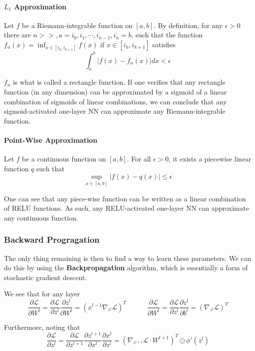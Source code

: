 \documentclass{article}
\newcommand{\loss}{\mathcal{L}}
\begin{document}
\paragraph{$L_1$ Approximation}

Let $f$ be a Riemann-integrable function on $[a,b]$.
By definition, for any $\epsilon > 0$ there are $n >> , a = i_0, i_1, \cdots, i_{n-1}, i_n = b$, such that the function $f_n(x) = \inf_{x \in [i_k, i_{k+1}]} f(x)$ if $x \in [i_k, i_{k+1}]$ satisfies
$$
\int_a^b |f(x) - f_n(x)| dx < \epsilon
$$

$f_n$ is what is called a rectangle function.
If one verifies that any rectangle function (in any dimension) can be approximated by a sigmoid of a linear combination of sigmoids of linear combinations, we can conclude that any sigmoid-activated one-layer NN can approximate any Riemann-integrable function.

\paragraph{Point-Wise Approximation}

Let $f$ be a continuous function on $[a,b]$.
For all $\epsilon > 0$, it exists a piecewise linear function $q$ such that
$$
\sup_{x \in [a, b]} |f(x) - q(x)| \leq \epsilon
$$

One can see that any piece-wise function can be written as a linear combination of RELU functions.
As such, any RELU-activated one-layer NN can approximate any continuous function.

\subsubsection{Backward Progragation}

The only thing remaining is then to find a way to learn these parameters.
We can do this by using the \textbf{Backpropagation} algorithm, which is essentially a form of stochastic gradient descent.

We see that for any layer
$$
\frac{\partial \loss}{\partial W^l} = 
\frac{\partial \loss}{\partial z^l} \frac{\partial z^l}{\partial W^l} =
(x^{l-1} \nabla_{z^l} \loss)^T
\quad \quad \quad
\frac{\partial \loss}{\partial W^l} = 
\frac{\partial \loss}{\partial z^l} \frac{\partial z^l}{\partial b^l} =
(\nabla_{z^l} \loss)^T
$$

Furthermore, noting that
$$
\frac{\partial \loss}{\partial z^l} =
\frac{\partial \loss}{\partial z^{l+1}} \frac{\partial z^{l+1}}{\partial x^l} \frac{\partial x^l}{\partial z^l} =
\left( \nabla_{z^{l+1}} \loss \cdot W^{l+1} \right)^T \odot \phi'(z^l)
$$
\end{document}
